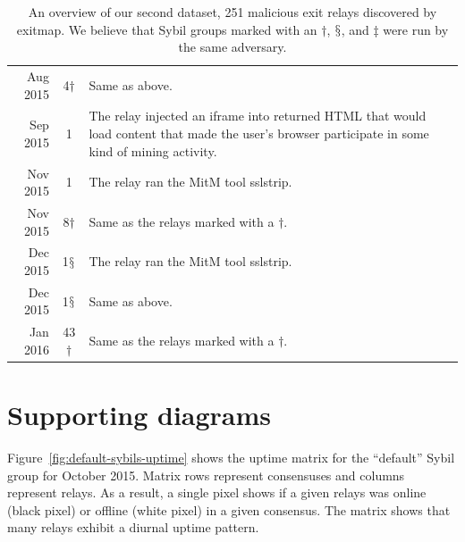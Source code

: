 \begin{table}[t]
\begin{tabular}{r c p{10cm}}
Aug 2015 & 4$\dagger$ & Same as above. \\

Sep 2015 & 1 & The relay injected an iframe into returned HTML that would load
content that made the user's browser participate in some kind of mining
activity. \\

Nov 2015 & 1 & The relay ran the MitM tool sslstrip. \\

Nov 2015 & 8$\dagger$ & Same as the relays marked with a $\dagger$. \\

Dec 2015 & 1$\mathsection$ & The relay ran the MitM tool sslstrip. \\

Dec 2015 & 1$\mathsection$ & Same as above. \\

Jan 2016 & 43$\dagger$ & Same as the relays marked with a $\dagger$. \\
\hline
\end{tabular}
\caption{An overview of our second dataset, 251 malicious exit relays discovered
by exitmap.  We believe that Sybil groups marked with an $\dagger$,
$\mathsection$, and $\ddagger$ were run by the same adversary.}
\label{tab:exitmap-dataset}
\end{table}

\section{Supporting diagrams}
Figure~\ref{fig:default-sybils-uptime} shows the uptime matrix for the
``default'' Sybil group for October 2015.  Matrix rows represent consensuses and
columns represent relays.  As a result, a single pixel shows if a given relays
was online (black pixel) or offline (white pixel) in a given consensus.  The
matrix shows that many relays exhibit a diurnal uptime pattern.

